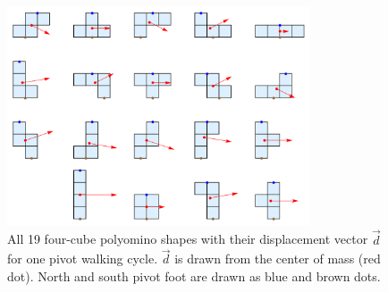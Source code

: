 \begin{figure}
	\centering
	\includegraphics[width=0.80\textwidth]{figures/displacement_pivot_walking.png}
	\caption{All 19 four-cube polyomino shapes with their displacement vector $\vec{d}$ for one pivot walking cycle. $\vec{d}$ is drawn from the center of mass (red dot). North and south pivot foot are drawn as blue and brown dots.}
	\label{fig:displacement_pivot_walking}
\end{figure}

